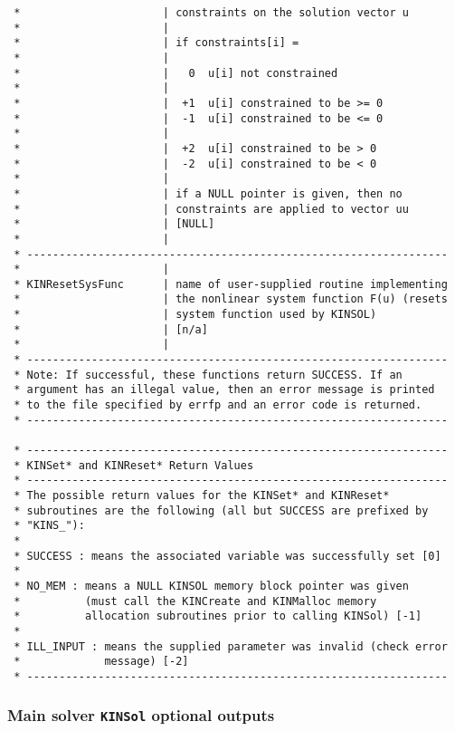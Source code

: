 \documentclass[11pt]{article}
\begin{document}
\begin{verbatim}
 *                      | constraints on the solution vector u
 *                      | 
 *                      | if constraints[i] =
 *                      |
 *                      |   0  u[i] not constrained
 *                      |
 *                      |  +1  u[i] constrained to be >= 0
 *                      |  -1  u[i] constrained to be <= 0
 *                      |
 *                      |  +2  u[i] constrained to be > 0
 *                      |  -2  u[i] constrained to be < 0
 *                      |
 *                      | if a NULL pointer is given, then no
 *                      | constraints are applied to vector uu
 *                      | [NULL]
 *                      |
 * -----------------------------------------------------------------
 *                      |
 * KINResetSysFunc      | name of user-supplied routine implementing
 *                      | the nonlinear system function F(u) (resets
 *                      | system function used by KINSOL)
 *                      | [n/a]
 *                      |
 * -----------------------------------------------------------------
 * Note: If successful, these functions return SUCCESS. If an
 * argument has an illegal value, then an error message is printed
 * to the file specified by errfp and an error code is returned.
 * -----------------------------------------------------------------

 * -----------------------------------------------------------------
 * KINSet* and KINReset* Return Values
 * -----------------------------------------------------------------
 * The possible return values for the KINSet* and KINReset*
 * subroutines are the following (all but SUCCESS are prefixed by
 * "KINS_"):
 *
 * SUCCESS : means the associated variable was successfully set [0]
 *
 * NO_MEM : means a NULL KINSOL memory block pointer was given
 *          (must call the KINCreate and KINMalloc memory
 *          allocation subroutines prior to calling KINSol) [-1]
 *
 * ILL_INPUT : means the supplied parameter was invalid (check error
 *             message) [-2]
 * -----------------------------------------------------------------

\end{verbatim}
\normalsize

\subsubsection{Main solver {\tt KINSol} optional outputs}
\end{document}
